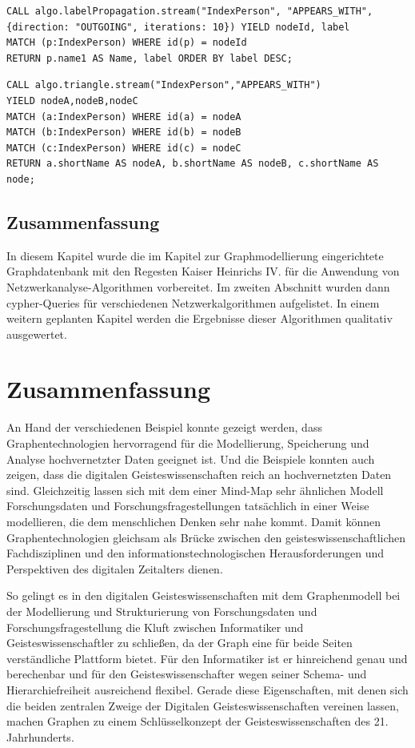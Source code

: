 \documentclass[ngerman,]{scrreprt}
\begin{document}
\begin{verbatim}
CALL algo.labelPropagation.stream("IndexPerson", "APPEARS_WITH", {direction: "OUTGOING", iterations: 10}) YIELD nodeId, label
MATCH (p:IndexPerson) WHERE id(p) = nodeId
RETURN p.name1 AS Name, label ORDER BY label DESC;
\end{verbatim}

\begin{verbatim}
CALL algo.triangle.stream("IndexPerson","APPEARS_WITH")
YIELD nodeA,nodeB,nodeC
MATCH (a:IndexPerson) WHERE id(a) = nodeA
MATCH (b:IndexPerson) WHERE id(b) = nodeB
MATCH (c:IndexPerson) WHERE id(c) = nodeC
RETURN a.shortName AS nodeA, b.shortName AS nodeB, c.shortName AS node;
\end{verbatim}

\section{Zusammenfassung}\label{zusammenfassung-7}

In diesem Kapitel wurde die im Kapitel zur Graphmodellierung eingerichtete Graphdatenbank mit den Regesten Kaiser Heinrichs IV. für die Anwendung von Netzwerkanalyse-Algorithmen vorbereitet. Im zweiten Abschnitt wurden dann cypher-Queries für verschiedenen Netzwerkalgorithmen aufgelistet. In einem weitern geplanten Kapitel werden die Ergebnisse dieser Algorithmen qualitativ ausgewertet.

\chapter{Zusammenfassung}\label{zusammenfassung-8}

An Hand der verschiedenen Beispiel konnte gezeigt werden, dass Graphentechnologien hervorragend für die Modellierung, Speicherung und Analyse hochvernetzter Daten geeignet ist. Und die Beispiele konnten auch zeigen, dass die digitalen Geisteswissenschaften reich an hochvernetzten Daten sind. Gleichzeitig lassen sich mit dem einer Mind-Map sehr ähnlichen Modell Forschungsdaten und Forschungsfragestellungen tatsächlich in einer Weise modellieren, die dem menschlichen Denken sehr nahe kommt. Damit können Graphentechnologien gleichsam als Brücke zwischen den geisteswissenschaftlichen Fachdisziplinen und den informationstechnologischen Herausforderungen und Perspektiven des digitalen Zeitalters dienen.

So gelingt es in den digitalen Geisteswissenschaften mit dem Graphenmodell bei der Modellierung und Strukturierung von Forschungsdaten und Forschungsfragestellung die Kluft zwischen Informatiker und Geisteswissenschaftler zu schließen, da der Graph eine für beide Seiten verständliche Plattform bietet. Für den Informatiker ist er hinreichend genau und berechenbar und für den Geisteswissenschafter wegen seiner Schema- und Hierarchiefreiheit ausreichend flexibel. Gerade diese Eigenschaften, mit denen sich die beiden zentralen Zweige der Digitalen Geisteswissenschaften vereinen lassen, machen Graphen zu einem Schlüsselkonzept der Geisteswissenschaften des 21. Jahrhunderts.
\end{document}
